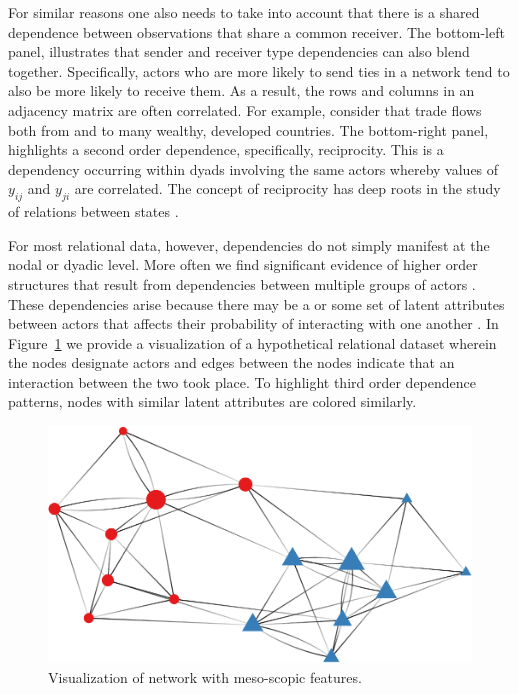 For similar reasons one also needs to take into account that there is a shared dependence between observations that share a common receiver. The bottom-left panel, illustrates that sender and receiver type dependencies can also blend together. Specifically, actors who are more likely to send ties in a network tend to also be more likely to receive them. As a result, the rows and columns in an adjacency matrix are often correlated. For example, consider that trade flows both from and to many wealthy, developed countries. The bottom-right panel, highlights a second order dependence, specifically, reciprocity. This is a dependency occurring within dyads involving the same actors whereby values of $y_{ij}$ and $y_{ji}$ are correlated. The concept of reciprocity has deep roots in the study of relations between states \citep{richardson:1960,keohane:1989}. 

For most relational data, however, dependencies do not simply manifest at the nodal or dyadic level. More often we find significant evidence of higher order structures that result from dependencies between multiple groups of actors \citep{poast:2010}. These dependencies arise because there may be a or some set of latent attributes between actors that affects their probability of interacting with one another \citep{zinnes:1967,wasserman:faust:1994}. In Figure~\ref{fig:thirdDeps} we provide a visualization of a hypothetical relational dataset wherein the nodes designate actors and edges between the nodes indicate that an interaction between the two took place. To highlight third order dependence patterns, nodes with similar latent attributes are colored similarly.

\begin{figure}[ht]
	\includegraphics[width=.6\textwidth]{stochEquiv_v2.pdf}
	\caption{Visualization of network with meso-scopic features.}
	\label{fig:thirdDeps}
\end{figure}

